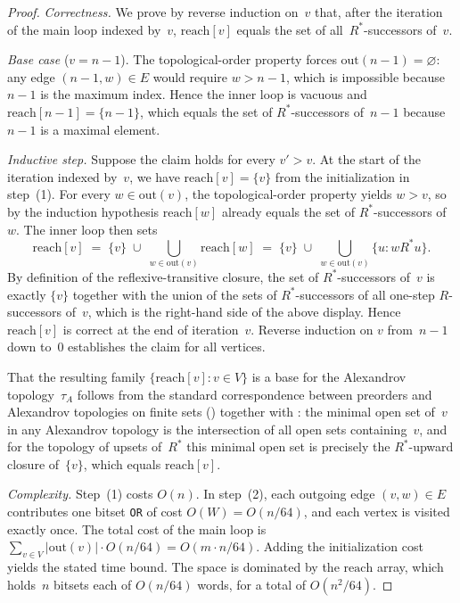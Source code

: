 \documentclass[11pt,a4paper]{article}
\theoremstyle{plain}
\theoremstyle{definition}
\begin{document}
\begin{proof}
\emph{Correctness.}  We prove by reverse induction on~$v$ that, after the
iteration of the main loop indexed by~$v$, $\mathrm{reach}[v]$ equals the
set of all~$R^{*}$-successors of~$v$.

\emph{Base case} ($v = n - 1$).  The topological-order property forces
$\mathrm{out}(n-1) = \varnothing$: any edge $(n-1, w) \in E$ would require
$w > n-1$, which is impossible because $n-1$ is the maximum index.  Hence
the inner loop is vacuous and $\mathrm{reach}[n-1] = \{n-1\}$, which equals
the set of $R^{*}$-successors of~$n-1$ because $n-1$ is a maximal element.

\emph{Inductive step.}  Suppose the claim holds for every $v' > v$.  At the
start of the iteration indexed by~$v$, we have $\mathrm{reach}[v] = \{v\}$
from the initialization in step~(1).  For every $w \in \mathrm{out}(v)$, the
topological-order property yields $w > v$, so by the induction hypothesis
$\mathrm{reach}[w]$ already equals the set of $R^{*}$-successors of~$w$.
The inner loop then sets
\[
  \mathrm{reach}[v] \;=\; \{v\} \;\cup\; \bigcup_{w \in \mathrm{out}(v)}
  \mathrm{reach}[w] \;=\; \{v\} \;\cup\; \bigcup_{w \in \mathrm{out}(v)}
  \bigl\{u : w R^{*} u\bigr\}.
\]
By definition of the reflexive-transitive closure, the set of
$R^{*}$-successors of~$v$ is exactly $\{v\}$ together with the union of the
sets of $R^{*}$-successors of all one-step $R$-successors of~$v$, which is
the right-hand side of the above display.  Hence $\mathrm{reach}[v]$ is
correct at the end of iteration~$v$.  Reverse induction on $v$ from~$n-1$
down to~$0$ establishes the claim for all vertices.

That the resulting family $\{\mathrm{reach}[v] : v \in V\}$ is a base for
the Alexandrov topology~$\tau_A$ follows from the standard correspondence
between preorders and Alexandrov topologies on finite sets
() together with
: the minimal open set of~$v$ in any Alexandrov
topology is the intersection of all open sets containing~$v$, and for the
topology of upsets of~$R^{*}$ this minimal open set is precisely the
$R^{*}$-upward closure of~$\{v\}$, which equals $\mathrm{reach}[v]$.

\emph{Complexity.}  Step~(1) costs $O(n)$.  In step~(2), each outgoing edge
$(v, w) \in E$ contributes one bitset \texttt{OR} of cost $O(W) = O(n/64)$,
and each vertex is visited exactly once.  The total cost of the main loop
is $\sum_{v \in V} |\mathrm{out}(v)| \cdot O(n/64) = O(m \cdot n / 64)$.
Adding the initialization cost yields the stated time bound.  The space is
dominated by the $\mathrm{reach}$ array, which holds~$n$ bitsets each of
$O(n/64)$ words, for a total of $O(n^{2}/64)$.
\end{proof}
\end{document}
